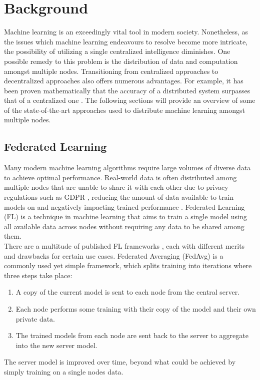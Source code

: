 \chapter{Background} \label{bg}
Machine learning is an exceedingly vital tool in modern society. Nonetheless, as the issues which machine learning endeavours to resolve become more intricate, the possibility of utilizing a single centralized intelligence diminishes. One possible remedy to this problem is the distribution of data and computation amongst multiple nodes. Transitioning from centralized approaches to decentralized approaches also offers numerous advantages. For example, it has been proven mathematically that the accuracy of a distributed system surpasses that of a centralized one \cite{swarmbetterthanone}. The following sections will provide an overview of some of the state-of-the-art approaches used to distribute machine learning amongst multiple nodes.

\section{Federated Learning}
Many modern machine learning algorithms require large volumes of diverse data to achieve optimal performance. Real-world data is often distributed among multiple nodes that are unable to share it with each other due to privacy regulations such as GDPR \cite{gdpr}, reducing the amount of data available to train models on and negatively impacting trained performance \cite{data_volume}. Federated Learning (FL) \cite{survey_on_fed_learning} is a technique in machine learning that aims to train a single model using all available data across nodes without requiring any data to be shared among them. \\

There are a multitude of published FL frameworks \cite{fed_table_survey}, each with different merits and drawbacks for certain use cases. Federated Averaging (FedAvg) \cite{fed_learning} is a commonly used yet simple framework, which splits training into iterations where three steps take place:
\begin{enumerate}
	\item A copy of the current model is sent to each node from the central server.
	\item Each node performs some training with their copy of the model and their own private data.
	\item The trained models from each node are sent back to the server to aggregate into the new server model.
\end{enumerate}
The server model is improved over time, beyond what could be achieved by simply training on a single nodes data. \\


